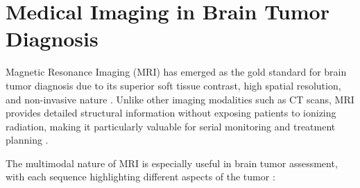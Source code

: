 \section{Medical Imaging in Brain Tumor Diagnosis}

Magnetic Resonance Imaging (MRI) has emerged as the gold standard for brain tumor diagnosis due to its superior soft tissue contrast, high spatial resolution, and non-invasive nature \cite{Bauer2013}. Unlike other imaging modalities such as CT scans, MRI provides detailed structural information without exposing patients to ionizing radiation, making it particularly valuable for serial monitoring and treatment planning \cite{Menze2015}.

The multimodal nature of MRI is especially useful in brain tumor assessment, with each sequence highlighting different aspects of the tumor \cite{Bakas2018}:

